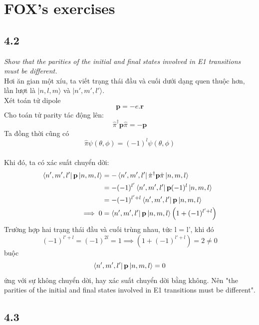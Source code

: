 \documentclass{article}
\begin{document}
\section*{FOX's exercises}
\subsection*{4.2}
\textit{Show that the parities of the initial and final states involved in E1 transitions must be different.}\\
Hơi ăn gian một xíu, ta viết trạng thái đầu và cuối dưới dạng quen thuộc hơn, lần lượt là $|n,l,m\rangle$ và $|n',m',l'\rangle$.\\
Xét toán tử dipole $$\textbf{p}=-e.\textbf{r}$$
Cho toán tử parity tác động lên:$$\hat{\pi}^\dagger \textbf{p}\hat{\pi}=-\textbf{p}$$
Ta đồng thời cũng có $$\hat{\pi}\psi(\theta,\phi)=(-1)^l\psi(\theta,\phi)$$\\
Khi đó, ta có xác suất chuyển dời:
\begin{equation}
	\begin{split}
		\bra{n',m',l'}\textbf{p}\ket{n,m,l}&=-\bra{n',m',l'}\hat{\pi}^\dagger \textbf{p}\hat{\pi}\ket{n,m,l}\\
		&=-(-1)^{l'}\bra{n',m',l'}\textbf{p}(-1)^l\ket{n,m,l}\\
		&=-(-1)^{l'+l}\bra{n',m',l'}\textbf{p}\ket{n,m,l}\\
	\implies 0&=\bra{n',m',l'}\textbf{p}\ket{n,m,l}\left(1+(-1)^{l'+l}\right)
	\end{split}
\end{equation}
Trường hợp hai trạng thái đầu và cuối trùng nhau, tức l = l', khi đó $$(-1)^{l'+l} = (-1)^{2l} = 1 \implies \left(1+(-1)^{l'+l}\right) =2 \neq 0 $$
buộc $$\bra{n',m',l'}\textbf{p}\ket{n,m,l} = 0$$
ứng với sự không chuyển dời, hay xác suất chuyển dời bằng không. Nên "the parities of the initial and final states involved in E1 transitions must be different".\\
\subsection*{4.3}
\end{document}
